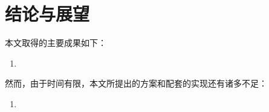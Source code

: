 \chapter{结论与展望}

本文取得的主要成果如下：

\begin{enumerate}
    \item 
\end{enumerate}

然而，由于时间有限，本文所提出的方案和配套的实现还有诸多不足：

\begin{enumerate}
    \item 
\end{enumerate}
